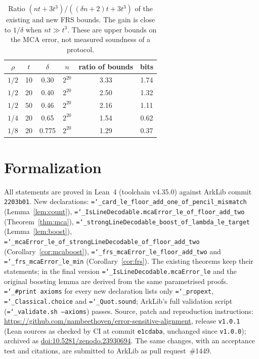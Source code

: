 \documentclass[11pt]{article}
\theoremstyle{definition}
\theoremstyle{remark}
\newcommand{\lean}[1]{\texttt{\hyphenchar\font=`\_\relax #1}}
\begin{document}
\begin{table}[h]
\centering
\begin{tabular}{cccccc}
\toprule
$\rho$ & $t$ & $\delta$ & $n$ & ratio of bounds & bits \\
\midrule
$1/2$ & 10 & 0.30 & $2^{20}$ & 3.33 & 1.74 \\
$1/2$ & 20 & 0.40 & $2^{20}$ & 2.50 & 1.32 \\
$1/2$ & 50 & 0.46 & $2^{20}$ & 2.16 & 1.11 \\
$1/4$ & 20 & 0.65 & $2^{20}$ & 1.54 & 0.62 \\
$1/8$ & 20 & 0.775 & $2^{20}$ & 1.29 & 0.37 \\
\bottomrule
\end{tabular}
\caption{Ratio $(nt+3t^3)/((\delta n+2)t+3t^3)$ of the existing and new FRS bounds. The gain is
close to $1/\delta$ when $nt\gg t^3$. These are upper bounds on the MCA error, not measured
soundness of a protocol.}
\end{table}

\section{Formalization}\label{sec:lean}

All statements are proved in Lean~4 (toolchain v4.35.0) against ArkLib commit \texttt{2203b01}.
New declarations: \lean{card\_le\_floor\_add\_one\_of\_pencil\_mismatch} (Lemma~\ref{lem:count}),
\lean{IsLineDecodable.mcaError\_le\_of\_floor\_add\_two} (Theorem~\ref{thm:mca}),
\lean{strongLineDecodable\_boost\_of\_lambda\_le\_target} (Lemma~\ref{lem:boost}),
\lean{mcaError\_le\_of\_strongLineDecodable\_of\_floor\_add\_two} (Corollary~\ref{cor:mcaboost}),
\lean{frs\_mcaError\_le\_floor\_add\_two} and \lean{frs\_mcaError\_le\_min}
(Corollary~\ref{cor:frs}). The existing theorems keep their statements; in the final version
\lean{IsLineDecodable.mcaError\_le} and the original boosting lemma are derived from the same
parametrised proofs. \lean{\#print axioms} for every new declaration lists only
\lean{propext}, \lean{Classical.choice} and \lean{Quot.sound}; ArkLib's full validation script
(\lean{validate.sh --axioms}) passes.
Source, patch and reproduction instructions: \url{https://github.com/nambeethoven/error-sensitive-alignment}, release \texttt{v1.0.1}
(Lean sources as checked by CI at commit \texttt{e1cdaba}, unchanged since \texttt{v1.0.0}); archived as
\href{https://doi.org/10.5281/zenodo.23930694}{doi:10.5281/zenodo.23930694}. The same changes, with an acceptance test and citations,
are submitted to ArkLib as pull request~\#1449.
\end{document}
